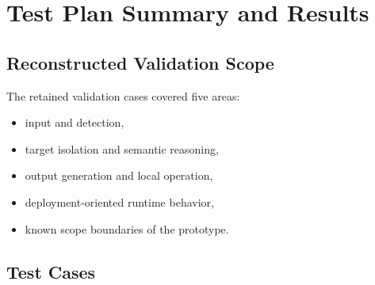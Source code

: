\section{Test Plan Summary and Results}
\label{sec:testing}

\subsection{Reconstructed Validation Scope}

The retained validation cases covered five areas:

\begin{itemize}[nosep]
  \item input and detection,
  \item target isolation and semantic reasoning,
  \item output generation and local operation,
  \item deployment-oriented runtime behavior,
  \item known scope boundaries of the prototype.
\end{itemize}

\subsection{Test Cases}

